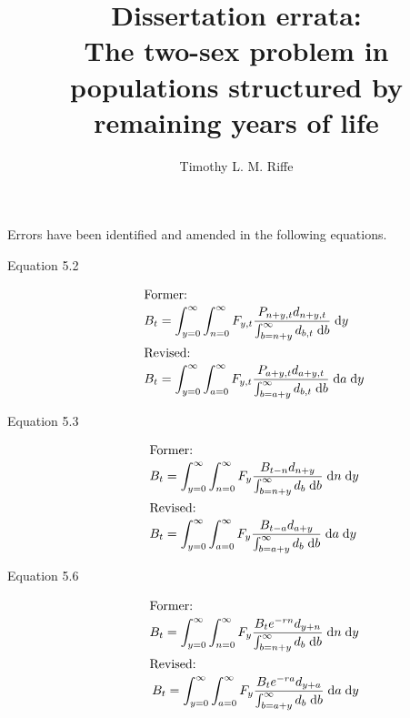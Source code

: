 \documentclass{article}
\newcommand{\dd}{\; \mathrm{d}}
\begin{document}
\title{Dissertation errata: \\The two-sex problem in populations structured by
remaining years of life}
\author{Timothy L. M. Riffe}
\maketitle

Errors have been identified and amended in the following equations.
\begin{description}
\item[Equation 5.2] 
\begin{align}
\intertext{Former:}
B_t &= \int_{y=0}^\infty \int_{n=0}^\infty F_{y,t}
\frac{P_{n+y,t}d_{n+y,t}}{\int_{b=n+y}^\infty d_{b,t} \dd b} \dd y \notag\\
\intertext{Revised:}
B_t &= \int_{y=0}^\infty \int_{a=0}^\infty F_{y,t}
\frac{P_{a+y,t}d_{a+y,t}}{\int_{b=a+y}^\infty d_{b,t} \dd b} \dd a \dd y \notag
\end{align}
\item[Equation 5.3]
\begin{align}
\intertext{Former:}
B_t &= \int_{y=0}^\infty \int_{n=0}^\infty F_y
\frac{B_{t-n}d_{n+y}}{\int_{b=n+y}^\infty d_b \dd b} \dd n \dd y \notag\\
\intertext{Revised:}
B_t &= \int_{y=0}^\infty \int_{a=0}^\infty F_y
\frac{B_{t-a}d_{a+y}}{\int_{b=a+y}^\infty d_b \dd b} \dd a \dd y \notag
\end{align}
\item[Equation 5.6]
\begin{align}
\intertext{Former:}
B_t = \int_{y=0}^\infty \int_{n=0}^\infty F_y
\frac{B_{t}e^{-rn}d_{y+n}}{\int_{b=n+y}^\infty d_b \dd b} \dd n \dd y \notag\\
\intertext{Revised:}
B_t = \int_{y=0}^\infty \int_{a=0}^\infty F_y
\frac{B_{t}e^{-ra}d_{y+a}}{\int_{b=a+y}^\infty d_b \dd b} \dd a \dd y \notag
\end{align}
\end{description}
\end{document}
